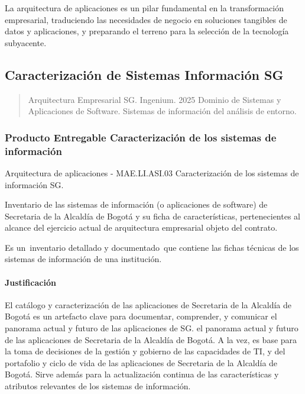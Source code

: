 \documentclass[
	a4paper, %
	12pt, %
]{include/CSSullivanBusinessReport}
\begin{document}
La arquitectura de aplicaciones es un pilar fundamental en la
transformación empresarial, traduciendo las necesidades de negocio en
soluciones tangibles de datos y aplicaciones, y preparando el terreno
para la selección de la tecnología subyacente.

\subsection{Caracterización de Sistemas Información
SG}\label{sec:caracterizaciuxf3n-de-sistemas-informaciuxf3n-sg}

\begin{quote}
Arquitectura Empresarial SG. Ingenium. 2025 Dominio de Sistemas y
Aplicaciones de Software. Sistemas de información del análisis de
entorno.
\end{quote}

\subsubsection{Producto Entregable Caracterización de los sistemas de
información}\label{sec:producto-entregable-caracterizaciuxf3n-de-los-sistemas-de-informaciuxf3n}

Arquitectura de aplicaciones - MAE.LI.ASI.03 Caracterización de los
sistemas de información SG.

Inventario de las sistemas de información (o aplicaciones de software)
de Secretaria de la Alcaldía de Bogotá y su ficha de características,
pertenecientes al alcance del ejercicio actual de arquitectura
empresarial objeto del contrato.

Es un~inventario detallado y documentado~que contiene las fichas
técnicas de los sistemas de información de una institución.

\paragraph{Justificación}\label{sec:justificaciuxf3n}

El catálogo y caracterización de las aplicaciones de Secretaria de la
Alcaldía de Bogotá es un artefacto clave para documentar, comprender, y
comunicar el panorama actual y futuro de las aplicaciones de SG. el
panorama actual y futuro de las aplicaciones de Secretaria de la
Alcaldía de Bogotá. A la vez, es base para la toma de decisiones de la
gestión y gobierno de las capacidades de TI, y del portafolio y ciclo de
vida de las aplicaciones de Secretaria de la Alcaldía de Bogotá. Sirve
además para la actualización continua de las características y atributos
relevantes de los sistemas de información.
\end{document}
